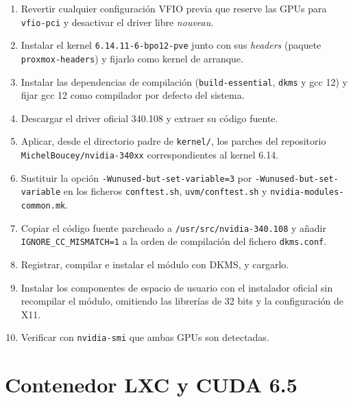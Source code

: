 \begin{enumerate}
    \item Revertir cualquier configuración VFIO previa que reserve las GPUs para \texttt{vfio-pci} y desactivar el driver libre \textit{nouveau}.
    \item Instalar el kernel \texttt{6.14.11-6-bpo12-pve} junto con sus \textit{headers} (paquete \texttt{proxmox-headers}) y fijarlo como kernel de arranque.
    \item Instalar las dependencias de compilación (\texttt{build-essential}, \texttt{dkms} y gcc 12) y fijar gcc 12 como compilador por defecto del sistema.
    \item Descargar el driver oficial 340.108 y extraer su código fuente.
    \item Aplicar, desde el directorio padre de \texttt{kernel/}, los parches del repositorio \texttt{MichelBoucey/nvidia-340xx} correspondientes al kernel 6.14.
    \item Sustituir la opción \texttt{-Wunused-but-set-variable=3} por \texttt{-Wunused-but-set-variable} en los ficheros \texttt{conftest.sh}, \texttt{uvm/conftest.sh} y \texttt{nvidia-modules-common.mk}.
    \item Copiar el código fuente parcheado a \texttt{/usr/src/nvidia-340.108} y añadir \texttt{IGNORE\_CC\_MISMATCH=1} a la orden de compilación del fichero \texttt{dkms.conf}.
    \item Registrar, compilar e instalar el módulo con DKMS, y cargarlo.
    \item Instalar los componentes de espacio de usuario con el instalador oficial sin recompilar el módulo, omitiendo las librerías de 32 bits y la configuración de X11.
    \item Verificar con \texttt{nvidia-smi} que ambas GPUs son detectadas.
\end{enumerate}

\section{Contenedor LXC y CUDA 6.5}

